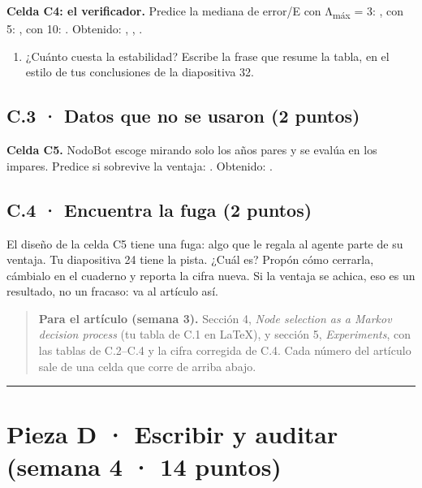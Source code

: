 
\textbf{Celda C4: el verificador.} Predice la mediana de error/E con Λ\textsubscript{máx} = 3: , con 5: , con 10: . Obtenido: , , .

\begin{enumerate}
\def\labelenumi{(\alph{enumi})}
\setcounter{enumi}{3}
\item ¿Cuánto cuesta la estabilidad? Escribe la frase que resume la tabla, en el estilo de tus conclusiones de la diapositiva 32.
\end{enumerate}

\subsection{C.3 · Datos que no se usaron (2 puntos)}

\textbf{Celda C5.} NodoBot escoge mirando solo los años pares y se evalúa en los impares. Predice si sobrevive la ventaja: . Obtenido: .

\subsection{C.4 · Encuentra la fuga (2 puntos)}

El diseño de la celda C5 tiene una fuga: algo que le regala al agente parte de su ventaja. Tu diapositiva 24 tiene la pista. ¿Cuál es? Propón cómo cerrarla, cámbialo en el cuaderno y reporta la cifra nueva. Si la ventaja se achica, eso es un resultado, no un fracaso: va al artículo así.


\begin{quote}
\textbf{Para el artículo (semana 3).} Sección 4, \emph{Node selection as a Markov decision process} (tu tabla de C.1 en LaTeX), y sección 5, \emph{Experiments}, con las tablas de C.2--C.4 y la cifra corregida de C.4. Cada número del artículo sale de una celda que corre de arriba abajo.
\end{quote}

\begin{center}\rule{0.5\linewidth}{0.5pt}\end{center}

\section{Pieza D · Escribir y auditar (semana 4 · 14 puntos)}

